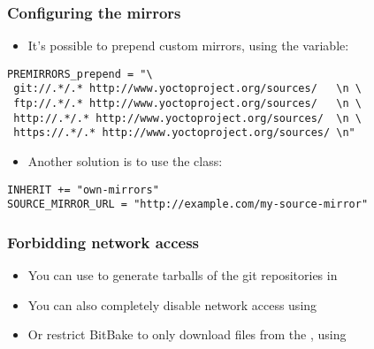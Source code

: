 \begin{frame}[fragile]
  \frametitle{Configuring the mirrors}
  \begin{itemize}
    \item It's possible to prepend custom mirrors, using the
       variable:
  \end{itemize}
  \begin{block}{}
    \begin{verbatim}
PREMIRRORS_prepend = "\
 git://.*/.* http://www.yoctoproject.org/sources/   \n \
 ftp://.*/.* http://www.yoctoproject.org/sources/   \n \
 http://.*/.* http://www.yoctoproject.org/sources/  \n \
 https://.*/.* http://www.yoctoproject.org/sources/ \n"
    \end{verbatim}
  \end{block}
  \begin{itemize}
    \item Another solution is to use the  class:
  \end{itemize}
  \begin{block}{}
    \begin{verbatim}
INHERIT += "own-mirrors"
SOURCE_MIRROR_URL = "http://example.com/my-source-mirror"
    \end{verbatim}
  \end{block}
\end{frame}

\begin{frame}[fragile]
  \frametitle{Forbidding network access}
  \begin{itemize}
    \item You can use  to
      generate tarballs of the git repositories in 
    \item You can also completely disable network access using
    \item Or restrict BitBake to only download files from the
      \code{PREMIRRORS}, using 
  \end{itemize}
\end{frame}
